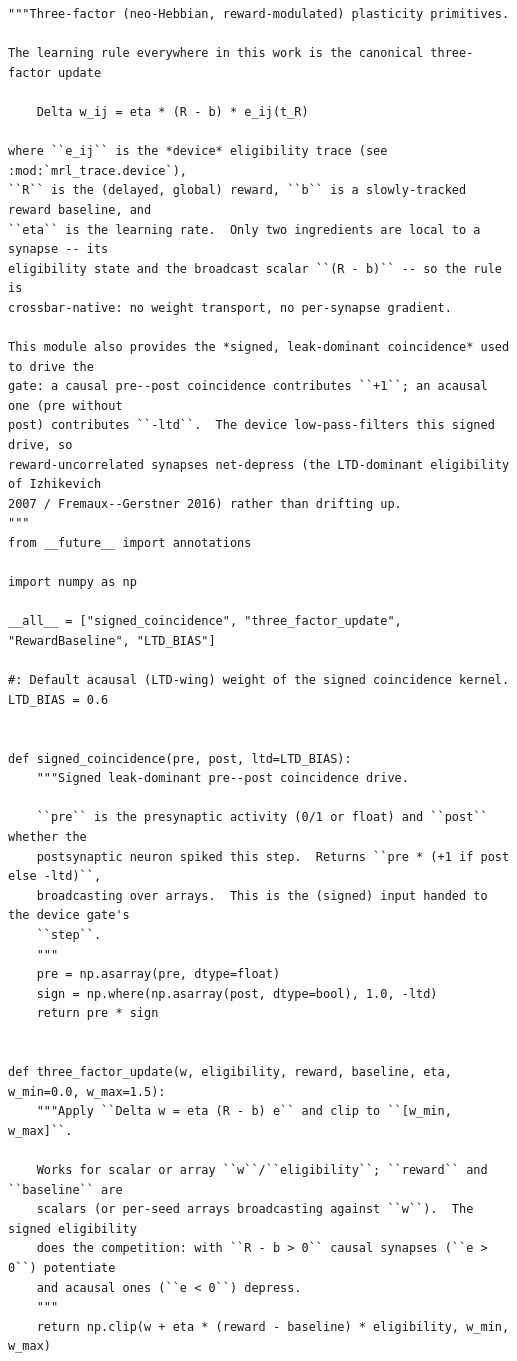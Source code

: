 \begin{lstlisting}[caption={mrl\_trace/learning.py},label={lst:siox-src-learning}]
"""Three-factor (neo-Hebbian, reward-modulated) plasticity primitives.

The learning rule everywhere in this work is the canonical three-factor update

    Delta w_ij = eta * (R - b) * e_ij(t_R)

where ``e_ij`` is the *device* eligibility trace (see :mod:`mrl_trace.device`),
``R`` is the (delayed, global) reward, ``b`` is a slowly-tracked reward baseline, and
``eta`` is the learning rate.  Only two ingredients are local to a synapse -- its
eligibility state and the broadcast scalar ``(R - b)`` -- so the rule is
crossbar-native: no weight transport, no per-synapse gradient.

This module also provides the *signed, leak-dominant coincidence* used to drive the
gate: a causal pre--post coincidence contributes ``+1``; an acausal one (pre without
post) contributes ``-ltd``.  The device low-pass-filters this signed drive, so
reward-uncorrelated synapses net-depress (the LTD-dominant eligibility of Izhikevich
2007 / Fremaux--Gerstner 2016) rather than drifting up.
"""
from __future__ import annotations

import numpy as np

__all__ = ["signed_coincidence", "three_factor_update", "RewardBaseline", "LTD_BIAS"]

#: Default acausal (LTD-wing) weight of the signed coincidence kernel.
LTD_BIAS = 0.6


def signed_coincidence(pre, post, ltd=LTD_BIAS):
    """Signed leak-dominant pre--post coincidence drive.

    ``pre`` is the presynaptic activity (0/1 or float) and ``post`` whether the
    postsynaptic neuron spiked this step.  Returns ``pre * (+1 if post else -ltd)``,
    broadcasting over arrays.  This is the (signed) input handed to the device gate's
    ``step``.
    """
    pre = np.asarray(pre, dtype=float)
    sign = np.where(np.asarray(post, dtype=bool), 1.0, -ltd)
    return pre * sign


def three_factor_update(w, eligibility, reward, baseline, eta, w_min=0.0, w_max=1.5):
    """Apply ``Delta w = eta (R - b) e`` and clip to ``[w_min, w_max]``.

    Works for scalar or array ``w``/``eligibility``; ``reward`` and ``baseline`` are
    scalars (or per-seed arrays broadcasting against ``w``).  The signed eligibility
    does the competition: with ``R - b > 0`` causal synapses (``e > 0``) potentiate
    and acausal ones (``e < 0``) depress.
    """
    return np.clip(w + eta * (reward - baseline) * eligibility, w_min, w_max)



\end{lstlisting}
